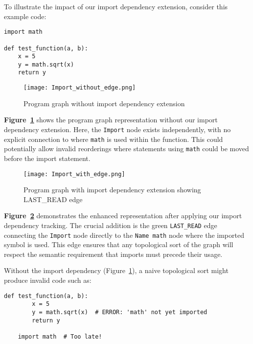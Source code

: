 \documentclass[%
thesis=student,%
coverpage=false,%
titlepage=false,%
headmarks=true, %
english,%
font=libertine, %
math=newpxtx, %
BCOR=5mm,%
coverBCOR=11mm%
]{tum-templates/book/tumbook}
\begin{document}
To illustrate the impact of our import dependency extension, consider this example code:

\begin{lstlisting}[style=pythonstyle, caption={An example for code with an import statement}]
import math
    
def test_function(a, b):
    x = 5
    y = math.sqrt(x)
    return y
\end{lstlisting}

\begin{figure}[htbp]
    \centering
    \texttt{[image: Import\_without\_edge.png]}
    \caption{Program graph without import dependency extension}
    \label{fig:Import_without_edge}
\end{figure}

\textbf{Figure~\ref{fig:Import_without_edge}} shows the program graph representation without our import dependency extension. Here, the \texttt{Import} node exists independently, with no explicit connection to where \texttt{math} is used within the function. This could potentially allow invalid reorderings where statements using \texttt{math} could be moved before the import statement.

\begin{figure}[htbp]
    \centering
    \texttt{[image: Import\_with\_edge.png]}
    \caption{Program graph with import dependency extension showing LAST\_READ edge}
    \label{fig:Import_with_edge}
\end{figure}

\textbf{Figure~\ref{fig:Import_with_edge}} demonstrates the enhanced representation after applying our import dependency tracking. The crucial addition is the green \texttt{LAST\_READ} edge connecting the \texttt{Import} node directly to the \texttt{Name math} node where the imported symbol is used. This edge ensures that any topological sort of the graph will respect the semantic requirement that imports must precede their usage.

Without the import dependency (Figure~\ref{fig:Import_without_edge}), a naive topological sort might produce invalid code such as:

\begin{lstlisting}[style=pythonstyle, caption={Without the necessary dependency the import statement is misplace}, label={lst:import}]
def test_function(a, b):
        x = 5
        y = math.sqrt(x)  # ERROR: 'math' not yet imported
        return y
    
    import math  # Too late!
\end{lstlisting}
\end{document}
